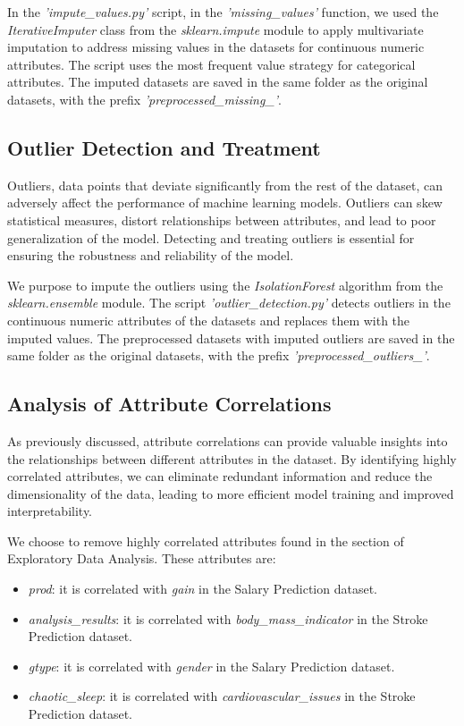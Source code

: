 \documentclass[runningheads]{paper}
\begin{document}
In the \textit{'impute\_values.py'} script, in the \textit{'missing\_values'} function,
we used the \textit{IterativeImputer}
class from the \textit{sklearn.impute} module to apply multivariate imputation to
address missing values in the datasets for continuous numeric attributes. The script
uses the most frequent value strategy for categorical attributes. The imputed datasets
are saved in the same folder as the original datasets, with the prefix
\textit{'preprocessed\_missing\_'}.

\subsection{Outlier Detection and Treatment}
Outliers, data points that deviate significantly from the rest of the dataset,
can adversely affect the performance of machine learning models. Outliers can
skew statistical measures, distort relationships between attributes, and lead to
poor generalization of the model. Detecting and treating outliers is essential
for ensuring the robustness and reliability of the model.

We purpose to impute the outliers using the \textit{IsolationForest} algorithm
from the \textit{sklearn.ensemble} module. The script \textit{'outlier\_detection.py'}
detects outliers in the continuous numeric attributes of the datasets and replaces
them with the imputed values. The preprocessed datasets with imputed outliers are
saved in the same folder as the original datasets, with the prefix
\textit{'preprocessed\_outliers\_'}.

\subsection{Analysis of Attribute Correlations}
As previously discussed, attribute correlations can provide valuable insights
into the relationships between different attributes in the dataset. By identifying
highly correlated attributes, we can eliminate redundant information and reduce
the dimensionality of the data, leading to more efficient model training and
improved interpretability.

We choose to remove highly correlated attributes found in the section of
Exploratory Data Analysis. These attributes are:

\begin{itemize}
    \item \textit{prod}: it is correlated with \textit{gain} in the Salary Prediction dataset.
    \item \textit{analysis\_results}: it is correlated with \textit{body\_mass\_indicator} in the Stroke Prediction dataset.
    \item \textit{gtype}: it is correlated with \textit{gender} in the Salary Prediction dataset.
    \item \textit{chaotic\_sleep}: it is correlated with \textit{cardiovascular\_issues} in the Stroke Prediction dataset.
\end{itemize}
\end{document}
